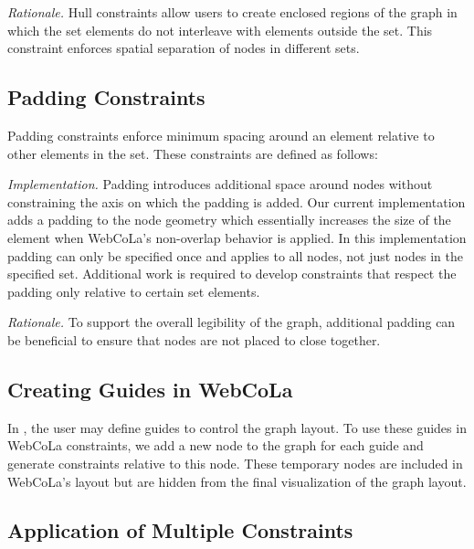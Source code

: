 \emph{Rationale.}
Hull constraints allow users to create enclosed regions of the graph in
which the set elements do not interleave with elements outside the set. This
constraint enforces spatial separation of nodes in different sets.


\subsection{Padding Constraints}

Padding constraints enforce minimum spacing around an element relative
to other elements in the set. These constraints are defined as follows:

\constraintsFigure

\emph{Implementation.}
Padding introduces additional space around nodes without constraining the
axis on which the padding is added. Our current implementation adds a
padding to the node geometry which essentially increases the size of the element
when WebCoLa's non-overlap behavior is applied. In this implementation
padding can only be specified once and applies to all nodes, not just nodes
in the specified set. Additional work is required to develop constraints that
respect the padding only relative to certain set elements.


\emph{Rationale.}
To support the overall legibility of the graph, additional padding can be
beneficial to ensure that nodes are not placed to close together.

\subsection{Creating Guides in WebCoLa}

In \projectname, the user may define guides to control the graph layout.
To use these guides in WebCoLa constraints, we add a new node to the graph
for each guide and generate constraints relative to this node. These 
temporary nodes are included in WebCoLa's layout but are hidden from the
final visualization of the graph layout.

\subsection{Application of Multiple Constraints}
